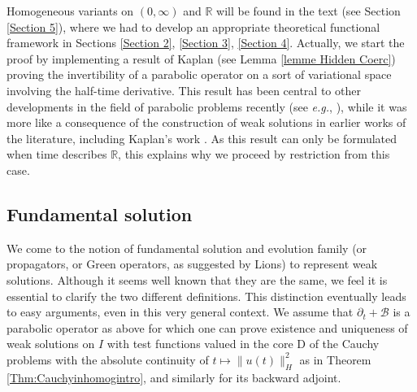 \documentclass[11pt, letterpaper]{amsart}
\theoremstyle{definition}
\theoremstyle{remark}
\numberwithin{equation}{section}
\begin{document}
Homogeneous variants on $(0,\infty)$ and $\mathbb{R}$ will be found in the text (see Section \ref{Section 5}),  where we had to develop an appropriate theoretical functional framework in Sections \ref{Section 2}, \ref{Section 3}, \ref{Section 4}. Actually, we start the proof by implementing a result of Kaplan (see Lemma \ref{lemme Hidden Coerc})  proving the invertibility of a parabolic operator on a sort of variational space involving the half-time derivative. This result has been central to other developments in the field  of parabolic problems recently (see \textit{e.g.}, \cite{nystrom2017l2, auscher20202, auscher2023universal}), while it was more like a consequence of the construction of weak solutions in earlier works of the literature, including Kaplan's work \cite{kaplan1966abstract}. As this result can only be formulated when time describes $\mathbb{R}$,  this explains why we proceed by restriction from this case.


\subsection{Fundamental solution} 

We come to the notion of fundamental solution and evolution family (or propagators, or Green operators, as suggested by Lions) to represent weak solutions. Although it seems well known that they are the same, we feel it is  essential to clarify the two different definitions. This distinction eventually leads to easy arguments, even in this very general context.  We assume that $\partial_t + \mathcal{B}$ is a parabolic operator as above for which one can prove existence and uniqueness of weak solutions on $I$ with test functions valued in the core $\mathrm{D}$
 of the Cauchy problems with the absolute continuity of $t\mapsto \|u(t)\|_{H}^2$ as in Theorem \ref{Thm:Cauchyinhomogintro}, and similarly for its backward adjoint. 
\end{document}
